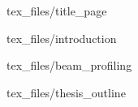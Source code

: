 \documentclass[a4paper,10pt]{article}
\begin{document}
{tex_files/title_page}
\clearpage

\newpage
\tableofcontents
{}
\newpage
{}
\setcounter{page}{2}

{tex_files/introduction}

{tex_files/beam_profiling}

{tex_files/thesis_outline}
\end{document}
